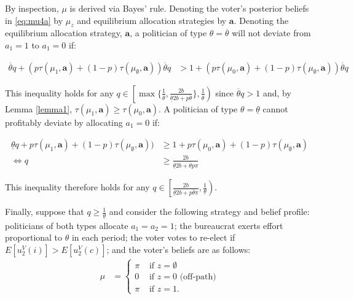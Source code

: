 \documentclass[11pt,english]{article}
\begin{document}
By inspection, $\mu$ is derived via Bayes' rule. Denoting the voter's posterior beliefs in \eqref{eq:mu4a} by $\mu_z$ and equilibrium allocation strategies by $\boldsymbol{a}$. Denoting the equilibrium allocation strategy, $\boldsymbol{a}$, a politician of type $\theta = \overline{\theta}$ will not deviate from $a_1 = 1$ to $a_1 = 0$ if:

\begin{align*}
\overline{\theta}q + (p\tau(\mu_1, \boldsymbol{a}) + (1-p) \tau(\mu_\emptyset, \boldsymbol{a}))\overline{\theta}q&>1 + (p\tau(\mu_0, \boldsymbol{a}) + (1-p) \tau(\mu_\emptyset, \boldsymbol{a}))\overline{\theta}q
\end{align*}

This inequality holds for any $q \in \left[ \max\{\frac{1}{\overline{\theta}},\frac{2b}{\underline{\theta}2b + p\overline{\theta}}\}, \frac{1}{\overline{\theta}}\right)$ since $\overline{\theta}q > 1$ and, by Lemma \ref{lemma1}, $\tau(\mu_1, \boldsymbol{a}) \geq \tau(\mu_0, \boldsymbol{a})$. A politician of type $\theta = \underline{\theta}$ cannot profitably deviate by allocating $a_1=0$ if:

\begin{align*}
\underline{\theta}q + p\tau(\mu_1, \boldsymbol{a}) + (1-p) \tau(\mu_\emptyset, \boldsymbol{a}))&\geq1 + p\tau(\mu_0, \boldsymbol{a}) + (1-p) \tau(\mu_\emptyset, \boldsymbol{a})\\
\Leftrightarrow q &\geq\frac{2b}{\underline{\theta}2b +\overline{\theta}p \pi}
\end{align*}

\noindent This inequality therefore holds for any $q \in \left[\frac{2b}{\underline{\theta}2b + p\overline{\theta}\pi}, \frac{1}{\underline{\theta}}\right)$.


Finally, suppose that $q \geq \frac{1}{\underline{\theta}}$ and consider the following strategy and belief profile: politicians of both types allocate $a_1 = a_2 = 1$; the bureaucrat exerts effort proportional to $\theta$ in each period; the voter votes to re-elect if $E[u_2^V(i)] > E[u_2^V(c)]$; and the voter's beliefs are as follows:
\begin{align}\label{eq:mu5a}
\mu &= \begin{cases}
\pi & \text{ if } z = \emptyset\\
0 & \text{ if } z = 0 \text{ (off-path)}\\
\pi & \text{ if } z= 1. 
\end{cases}
\end{align}
\end{document}
